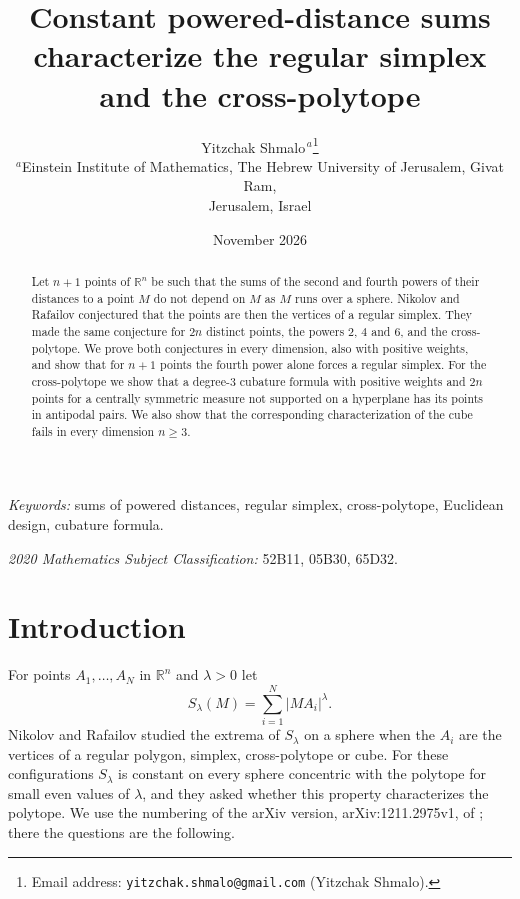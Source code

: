 \documentclass[11pt]{article}
\title{Constant powered-distance sums characterize the regular simplex and the cross-polytope}
\author{Yitzchak Shmalo$^{\,a}$\thanks{Email address:
\texttt{yitzchak.shmalo@gmail.com} (Yitzchak Shmalo).}\\
{\small $^{a}$Einstein Institute of Mathematics, The Hebrew University of
Jerusalem, Givat Ram,}\\
{\small Jerusalem, Israel}}
\date{November 2026}
\theoremstyle{remark}
\begin{document}
\maketitle

\begin{abstract}
Let $n+1$ points of $\mathbb{R}^n$ be such that the sums of the second and fourth powers of their distances to a point $M$ do not depend on $M$ as $M$ runs over a sphere. Nikolov and Rafailov conjectured that the points are then the vertices of a regular simplex. They made the same conjecture for $2n$ distinct points, the powers $2$, $4$ and $6$, and the cross-polytope. We prove both conjectures in every dimension, also with positive weights, and show that for $n+1$ points the fourth power alone forces a regular simplex. For the cross-polytope we show that a degree-$3$ cubature formula with positive weights and $2n$ points for a centrally symmetric measure not supported on a hyperplane has its points in antipodal pairs. We also show that the corresponding characterization of the cube fails in every dimension $n\ge3$.
\end{abstract}

\noindent\textit{Keywords:} sums of powered distances, regular simplex, cross-polytope, Euclidean design, cubature formula.

\noindent\textit{2020 Mathematics Subject Classification:} 52B11, 05B30, 65D32.

\section{Introduction}\label{sec:intro}

For points $A_1,\dots,A_N$ in $\mathbb{R}^n$ and $\lambda>0$ let
\[
S_\lambda(M)=\sum_{i=1}^N |MA_i|^\lambda .
\]
Nikolov and Rafailov \cite{NR} studied the extrema of $S_\lambda$ on a sphere when the $A_i$ are the vertices of a regular polygon, simplex, cross-polytope or cube. For these configurations $S_\lambda$ is constant on every sphere concentric with the polytope for small even values of $\lambda$, and they asked whether this property characterizes the polytope. We use the numbering of the arXiv version, arXiv:1211.2975v1, of \cite{NR}; there the questions are the following.
\end{document}
